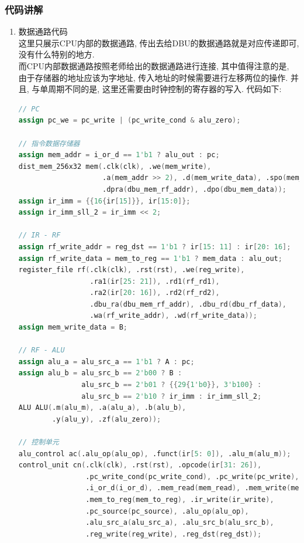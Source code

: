 \documentclass[UTF8]{article}
\begin{document}
\subsubsection{代码讲解}
\begin{enumerate}
	\item 数据通路代码\\
	这里只展示CPU内部的数据通路, 传出去给DBU的数据通路就是对应传递即可, 没有什么特别的地方.\\
	而CPU内部数据通路按照老师给出的数据通路进行连接, 其中值得注意的是, 由于存储器的地址应该为字地址, 传入地址的时候需要进行左移两位的操作. 
	并且, 与单周期不同的是, 这里还需要由时钟控制的寄存器的写入.
	代码如下:
	\begin{lstlisting}[language=verilog]
// PC
assign pc_we = pc_write | (pc_write_cond & alu_zero);

// 指令数据存储器
assign mem_addr = i_or_d == 1'b1 ? alu_out : pc;
dist_mem_256x32 mem(.clk(clk), .we(mem_write), 
                    .a(mem_addr >> 2), .d(mem_write_data), .spo(mem_read_data),
                    .dpra(dbu_mem_rf_addr), .dpo(dbu_mem_data));
assign ir_imm = {{16{ir[15]}}, ir[15:0]};
assign ir_imm_sll_2 = ir_imm << 2;

// IR - RF
assign rf_write_addr = reg_dst == 1'b1 ? ir[15: 11] : ir[20: 16];
assign rf_write_data = mem_to_reg == 1'b1 ? mem_data : alu_out;
register_file rf(.clk(clk), .rst(rst), .we(reg_write),
                 .ra1(ir[25: 21]), .rd1(rf_rd1),
                 .ra2(ir[20: 16]), .rd2(rf_rd2),
                 .dbu_ra(dbu_mem_rf_addr), .dbu_rd(dbu_rf_data),
                 .wa(rf_write_addr), .wd(rf_write_data));
assign mem_write_data = B;

// RF - ALU
assign alu_a = alu_src_a == 1'b1 ? A : pc;
assign alu_b = alu_src_b == 2'b00 ? B :
               alu_src_b == 2'b01 ? {{29{1'b0}}, 3'b100} :
               alu_src_b == 2'b10 ? ir_imm : ir_imm_sll_2;
ALU ALU(.m(alu_m), .a(alu_a), .b(alu_b),  
        .y(alu_y), .zf(alu_zero));

// 控制单元
alu_control ac(.alu_op(alu_op), .funct(ir[5: 0]), .alu_m(alu_m));
control_unit cn(.clk(clk), .rst(rst), .opcode(ir[31: 26]),
                .pc_write_cond(pc_write_cond), .pc_write(pc_write),
                .i_or_d(i_or_d), .mem_read(mem_read), .mem_write(mem_write),
                .mem_to_reg(mem_to_reg), .ir_write(ir_write),
                .pc_source(pc_source), .alu_op(alu_op),
                .alu_src_a(alu_src_a), .alu_src_b(alu_src_b),
                .reg_write(reg_write), .reg_dst(reg_dst));


\end{lstlisting}
\end{enumerate}
\end{document}

